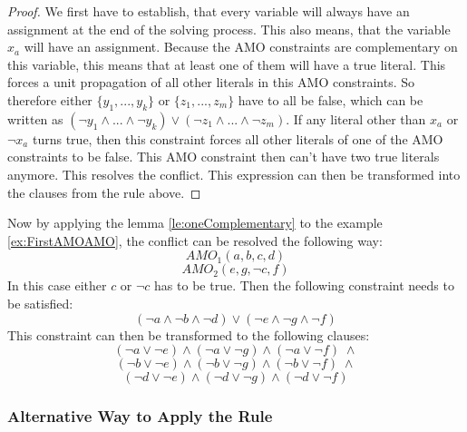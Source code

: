 \begin{proof}
We first have to establish, that every variable will always have an assignment at the end of the solving process. This also means, that the variable $x_a$ will have an assignment. Because the AMO constraints are complementary on this variable, this means that at least one of them will have a true literal. This forces a unit propagation of all other literals in this AMO constraints. So therefore either $\{y_1,...,y_k\}$ or $\{z_1,...,z_m\}$ have to all be false, which can be written as $(\neg y_1 \wedge ... \wedge \neg y_k) \vee (\neg z_1 \wedge ... \wedge \neg z_m)$. If any literal other than $x_a$ or $\neg x_a$ turns true, then this constraint forces all other literals of one of the AMO constraints to be false. This AMO constraint then can't have two true literals anymore. This resolves the conflict. This expression can then be transformed into the clauses from the rule above.
\end{proof}

Now by applying the lemma \ref{le:oneComplementary} to the example \ref{ex:FirstAMOAMO}, the conflict can be resolved the following way:
\begin{displaymath}
AMO_1(a,b,c,d)
\end{displaymath}
\begin{displaymath}
AMO_2(e,g,\neg c,f)
\end{displaymath}
In this case either $c$ or $\neg c$ has to be true. Then the following constraint needs to be satisfied:
\begin{displaymath}
(\neg a \wedge \neg b \wedge \neg d) \vee (\neg e \wedge \neg g \wedge \neg f)
\end{displaymath}
This constraint can then be transformed to the following clauses:
\begin{displaymath}
(\neg a \vee \neg e) \wedge (\neg a \vee \neg g) \wedge (\neg a \vee \neg f) \; \wedge
\end{displaymath}
\begin{displaymath}
(\neg b \vee \neg e) \wedge (\neg b \vee \neg g) \wedge (\neg b \vee \neg f) \; \wedge
\end{displaymath}
\begin{displaymath}
(\neg d \vee \neg e) \wedge (\neg d \vee \neg g) \wedge (\neg d \vee \neg f)
\end{displaymath}

\subsubsection{Alternative Way to Apply the Rule}

